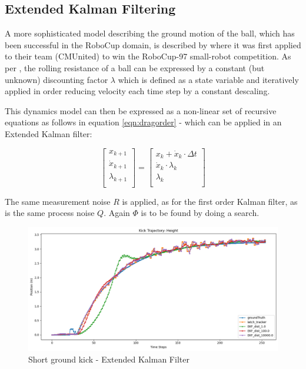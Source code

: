 \documentclass[a4paper,twoside,12pt]{report}
\begin{document}
\subsection{Extended Kalman Filtering}

A more sophisticated model describing the ground motion of the ball, which has been successful in the RoboCup domain, is described by \cite{kalmanmodel} where it was first applied to their team (CMUnited) to win the RoboCup-97 small-robot competition. As per \cite{kalmanmodel}, the rolling resistance of a ball can be expressed by a constant (but unknown) discounting factor $\lambda$ which is defined as a state variable and iteratively applied in order reducing velocity each time step by a constant descaling. 

This dynamics model can then be expressed as a non-linear set of recursive equations as follows in equation \ref{eqn:dragorder} - which can be applied in an Extended Kalman filter:

\begin{equation} 
\begin{bmatrix}
    x_{k+1} \\
    \dot{x}_{k+1} \\
	\lambda_{k+1} \\
\end{bmatrix}
=
\begin{bmatrix}
    x_{k} + \dot{x}_{k} \cdot \Delta t\\
    \dot{x}_{k} \cdot \lambda_{k} \\
	\lambda_{k} \\
\end{bmatrix}
\label{eqn:dragorder}
\end{equation}

The same measurement noise $R$ is applied, as for the first order Kalman filter, as is the same process noise $Q$. Again $\Phi$ is to be found by doing a search.

\begin{figure}[h!]
\begin{center}
\includegraphics[width=12cm]{images/ekf_ground_short.png}
\caption{Short ground kick - Extended Kalman Filter}
\label{fig:ekfgroundshort}
\end{center}
\end{figure}
\end{document}
